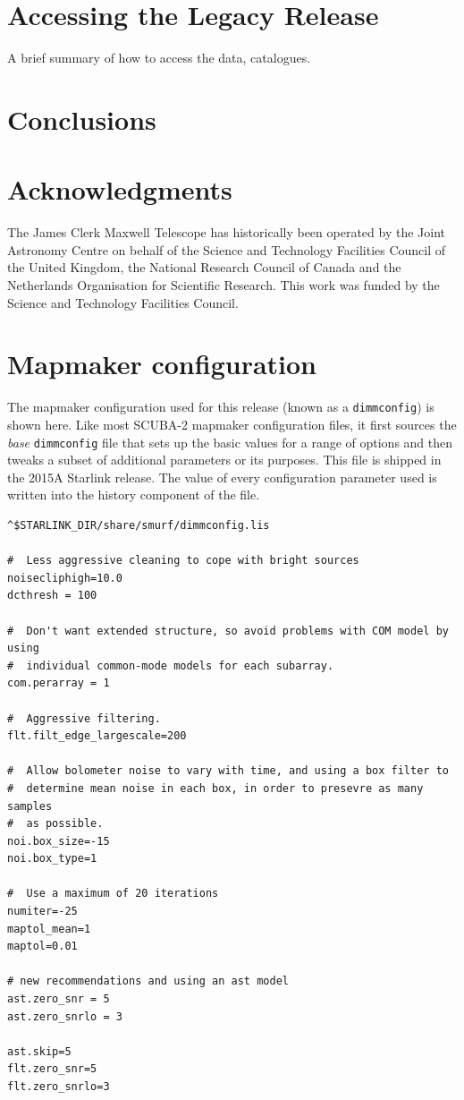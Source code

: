 \documentclass[usenatbib]{mnras}
\begin{document}
\section{Accessing the Legacy Release}
A brief summary of how to access the data, catalogues.

\section{Conclusions}

\section*{Acknowledgments}

The James Clerk Maxwell Telescope has historically been operated by
the Joint Astronomy Centre on behalf of the Science and Technology
Facilities Council of the United Kingdom, the National Research
Council of Canada and the Netherlands Organisation for Scientific
Research. This work was funded by the Science and Technology
Facilities Council.




\appendix
\onecolumn

\section{Mapmaker configuration}
\label{app:config}
The mapmaker configuration used for this release (known as a
\texttt{dimmconfig}) is shown here. Like most SCUBA-2 mapmaker
configuration files, it first sources the \emph{base}
\texttt{dimmconfig} file that sets up the basic values for a range of
options and then tweaks a subset of additional parameters or its
purposes. This file is shipped in the 2015A Starlink release. The
value of every configuration parameter used is written into the
history component of the file.

\begin{verbatim}
^$STARLINK_DIR/share/smurf/dimmconfig.lis

#  Less aggressive cleaning to cope with bright sources
noisecliphigh=10.0
dcthresh = 100

#  Don't want extended structure, so avoid problems with COM model by using
#  individual common-mode models for each subarray.
com.perarray = 1

#  Aggressive filtering.
flt.filt_edge_largescale=200

#  Allow bolometer noise to vary with time, and using a box filter to
#  determine mean noise in each box, in order to presevre as many samples
#  as possible.
noi.box_size=-15
noi.box_type=1

#  Use a maximum of 20 iterations
numiter=-25
maptol_mean=1
maptol=0.01

# new recommendations and using an ast model
ast.zero_snr = 5
ast.zero_snrlo = 3

ast.skip=5
flt.zero_snr=5
flt.zero_snrlo=3
\end{verbatim}


\label{lastpage}
\bsp
\end{document}
